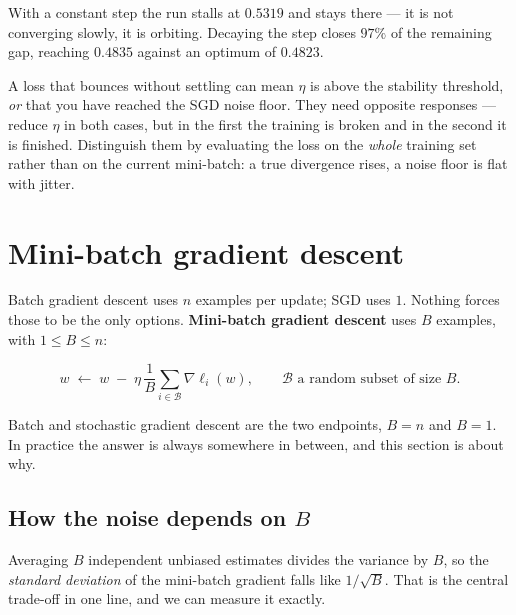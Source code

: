 \documentclass[11pt]{article}
\begin{document}
With a constant step the run stalls at $0.5319$ and stays there --- it is not
converging slowly, it is orbiting. Decaying the step closes $97\%$ of the
remaining gap, reaching $0.4835$ against an optimum of $0.4823$.

\begin{caution}
A loss that bounces without settling can mean $\eta$ is above the stability
threshold, \emph{or} that you have reached the SGD noise floor. They need
opposite responses --- reduce $\eta$ in both cases, but in the first the
training is broken and in the second it is finished. Distinguish them by
evaluating the loss on the \emph{whole} training set rather than on the current
mini-batch: a true divergence rises, a noise floor is flat with jitter.
\end{caution}

\section{Mini-batch gradient descent}
\label{sec:mini}

Batch gradient descent uses $n$ examples per update; SGD uses $1$. Nothing
forces those to be the only options. \textbf{Mini-batch gradient descent} uses
$B$ examples, with $1 \le B \le n$:

\begin{equation}
  \label{eq:mb}
  w \;\leftarrow\; w \;-\; \eta \, \frac{1}{B}\sum_{i \in \mathcal{B}}
    \nabla \ell_i(w),
  \qquad \mathcal{B} \text{ a random subset of size } B .
\end{equation}

Batch and stochastic gradient descent are the two endpoints, $B = n$ and
$B = 1$. In practice the answer is always somewhere in between, and this
section is about why.

\subsection{How the noise depends on $B$}

Averaging $B$ independent unbiased estimates divides the variance by $B$, so
the \emph{standard deviation} of the mini-batch gradient falls like
$1/\sqrt{B}$. That is the central trade-off in one line, and we can measure it
exactly.
\end{document}
